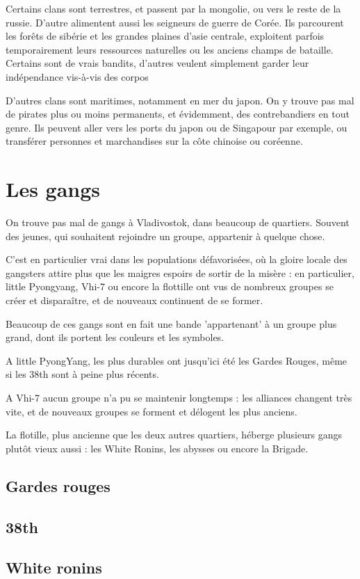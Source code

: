 \documentclass[10pt,a4paper]{book}
\begin{document}
Certains clans sont terrestres, et passent par la mongolie, ou vers le reste de la russie. D'autre alimentent aussi les seigneurs de guerre de Corée. Ils parcourent les forêts de sibérie et les grandes plaines d'asie centrale, exploitent parfois temporairement leurs ressources naturelles ou les anciens champs de bataille. Certains sont de vrais bandits, d'autres veulent simplement garder leur indépendance vis-à-vis des corpos

D'autres clans sont maritimes, notamment en mer du japon. On y trouve pas mal de pirates plus ou moins permanents, et évidemment, des contrebandiers en tout genre. Ils peuvent aller vers les ports du japon ou de Singapour par exemple, ou transférer personnes et marchandises sur la côte chinoise ou coréenne.
\section{Les gangs}
On trouve pas mal de gangs à Vladivostok, dans beaucoup de quartiers. Souvent des jeunes, qui souhaitent rejoindre un groupe, appartenir à quelque chose.

C'est en particulier vrai dans les populations défavorisées, où la gloire locale des gangsters attire plus que les maigres espoirs de sortir de la misère : en particulier, little Pyongyang, Vhi-7 ou encore la flottille ont vus de nombreux groupes se créer et disparaître, et de nouveaux continuent de se former.

Beaucoup de ces gangs sont en fait une bande 'appartenant' à un groupe plus grand, dont ils portent les couleurs et les symboles.

A little PyongYang, les plus durables ont jusqu'ici été les Gardes Rouges, même si les 38th sont à peine plus récents.

A Vhi-7 aucun groupe n'a pu se maintenir longtemps : les alliances changent très vite, et de nouveaux groupes se forment et délogent les plus anciens.

La flotille, plus ancienne que les deux autres quartiers, héberge plusieurs gangs plutôt vieux aussi : les White Ronins, les abysses ou encore la Brigade. 
\subsection{Gardes rouges}
\subsection{38th}
\subsection{White ronins}
\end{document}
